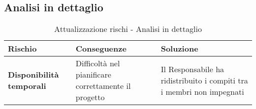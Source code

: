 \subsection{Analisi in dettaglio}
\begin{table}[htbp]
	\centering
	\begin{tabular}{| p{3cm} | p{6cm} | p{6cm} |}
		\hline
		\textbf{Rischio} & \textbf{Conseguenze} & \textbf{Soluzione} \\
		\hline
		\textbf{Disponibilità temporali} & Difficoltà nel pianificare correttamente il progetto & Il Responsabile ha ridistribuito i compiti tra i membri non impegnati 		 \\ \hline
	\end{tabular}
	\caption[Attualizzazione rischi - Analisi in dettaglio]{Attualizzazione rischi - Analisi in dettaglio}
\end{table}
\newpage

